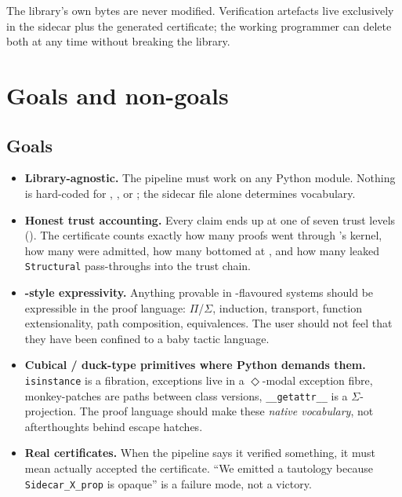 The library's own bytes are never modified.  Verification artefacts
live exclusively in the sidecar plus the generated certificate; the
working programmer can delete both at any time without breaking the
library.

\section{Goals and non-goals}
\label{sec:goals-nongoals}

\subsection*{Goals}

\begin{itemize}[leftmargin=1.7em]
\item \textbf{Library-agnostic.}  The pipeline must work on any
Python module.  Nothing is hard-coded for \Sympy{}, \NumPy{}, or
\Torch{}; the sidecar file alone determines vocabulary.

\item \textbf{Honest trust accounting.}  Every claim ends up at one
of seven trust levels ().  The certificate counts
exactly how many proofs went through \Lean's kernel, how many were
admitted, how many bottomed at \Zthree, and how many leaked
\texttt{Structural} pass-throughs into the trust chain.

\item \textbf{\Lean-style expressivity.}  Anything provable in
\CIC{}-flavoured systems should be expressible in the proof language:
$\Pi$/$\Sigma$, induction, transport, function extensionality, path
composition, equivalences.  The user should not feel that they have
been confined to a baby tactic language.

\item \textbf{Cubical / duck-type primitives where Python demands
them.}  \texttt{isinstance} is a fibration, exceptions live in a
$\Diamond$-modal exception fibre, monkey-patches are paths between
class versions, \texttt{\_\_getattr\_\_} is a $\Sigma$-projection.
The proof language should make these \emph{native vocabulary}, not
afterthoughts behind escape hatches.

\item \textbf{Real \Lean{} certificates.}  When the pipeline says it
verified something, it must mean \Lean{} actually accepted the
certificate.  ``We emitted a tautology because \texttt{Sidecar\_X\_prop}
is opaque'' is a failure mode, not a victory.
\end{itemize}

